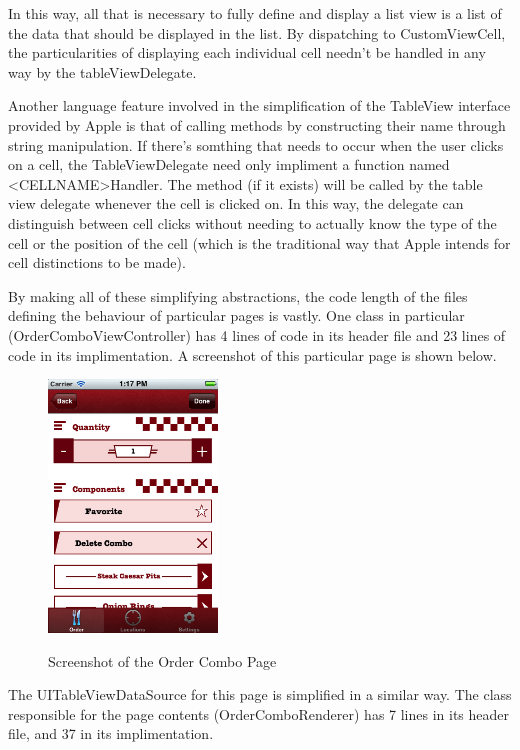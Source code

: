 \documentclass[se]{uw-wkrpt}
\begin{document}
In this way, all that is necessary to fully define and display a list view is a list of the data
that should be displayed in the list. By dispatching to CustomViewCell, the particularities of
displaying each individual cell needn't be handled in any way by the tableViewDelegate. 

Another language feature involved in the simplification of the TableView interface provided
by Apple is that of calling methods by constructing their name through string manipulation.
If there's somthing that needs to occur when the user clicks on a cell, the TableViewDelegate
need only impliment a function named <CELLNAME>Handler. The method (if it exists) will be called
by the table view delegate whenever the cell is clicked on. In this way, the delegate can 
distinguish between cell clicks without needing to actually know the type of the cell or the
position of the cell (which is the traditional way that Apple intends for cell distinctions to
be made). 

By making all of these simplifying abstractions, the code length of the files defining
the behaviour of particular pages is vastly. One class in particular (OrderComboViewController)
has 4 lines of code in its header file and 23 lines of code in its implimentation. A screenshot
of this particular page is shown below. 

\begin{figure}[h!]
  \caption{Screenshot of the Order Combo Page}
  \centering
    \includegraphics[width=0.4\textwidth]{orderComboPage}
  \label{fig:Combo Page}
\end{figure}

The UITableViewDataSource for this page is simplified in a similar way. The class responsible
for the page contents (OrderComboRenderer) has 7 lines in its header file, and 37 in its implimentation.
\end{document}
